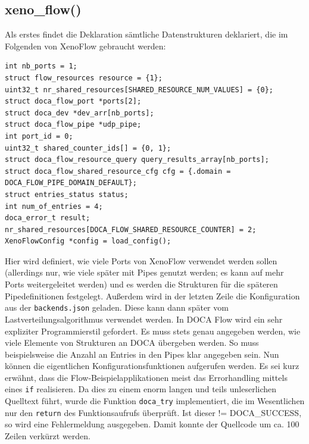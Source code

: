 \subsection{xeno\_flow()}
Als erstes findet die Deklaration sämtliche Datenstrukturen deklariert, die im Folgenden von XenoFlow gebraucht werden:
\begin{verbatim}
int nb_ports = 1;
struct flow_resources resource = {1};
uint32_t nr_shared_resources[SHARED_RESOURCE_NUM_VALUES] = {0};
struct doca_flow_port *ports[2];
struct doca_dev *dev_arr[nb_ports];
struct doca_flow_pipe *udp_pipe;
int port_id = 0;
uint32_t shared_counter_ids[] = {0, 1};
struct doca_flow_resource_query query_results_array[nb_ports];
struct doca_flow_shared_resource_cfg cfg = {.domain = DOCA_FLOW_PIPE_DOMAIN_DEFAULT};
struct entries_status status;
int num_of_entries = 4;
doca_error_t result;
nr_shared_resources[DOCA_FLOW_SHARED_RESOURCE_COUNTER] = 2;
XenoFlowConfig *config = load_config();
\end{verbatim}
Hier wird definiert, wie viele Ports von XenoFlow verwendet werden sollen (allerdings nur, wie viele später mit Pipes genutzt werden; es kann auf mehr Ports weitergeleitet werden) und es werden die Strukturen für die späteren Pipedefinitionen festgelegt. Außerdem wird in der letzten Zeile die Konfiguration aus der \texttt{backends.json} geladen. Diese kann dann später vom Lastverteilungsalgorithmus verwendet werden. In DOCA Flow wird ein sehr expliziter Programmierstil gefordert. Es muss stets genau angegeben werden, wie viele Elemente von Strukturen an DOCA übergeben werden. So muss beispielsweise die Anzahl an Entries in den Pipes klar angegeben sein.
\newline
Nun können die eigentlichen Konfigurationsfunktionen aufgerufen werden. Es sei kurz erwähnt, dass die Flow-Beispielapplikationen meist das Errorhandling mittels eines \texttt{if} realisieren. Da dies zu einem enorm langen und teils unleserlichen Quelltext führt, wurde die Funktion \texttt{doca\_try} implementiert, die im Wesentlichen nur den \texttt{return} des Funktionsaufrufs überprüft. Ist dieser != DOCA\_SUCCESS, so wird eine Fehlermeldung ausgegeben. Damit konnte der Quellcode um ca. 100 Zeilen verkürzt werden.
